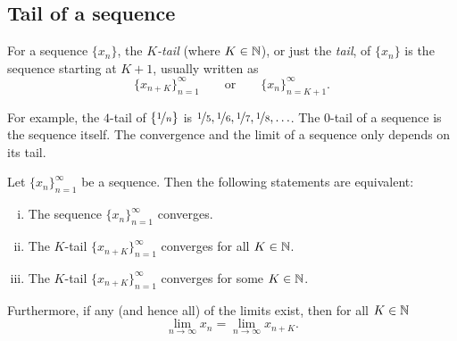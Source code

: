 \subsection{Tail of a sequence}

\begin{defn}
For a sequence $\{ x_n \}$,
the \emph{$K$-tail} (where $K \in {\mathbb{N}}$),
or just the
\emph{tail}, of
$\{ x_n \}$ is the sequence starting at $K+1$, usually written as
\begin{equation*}
\{ x_{n+K} \}_{n=1}^\infty
\qquad \text{or} \qquad \{ x_n \}_{n=K+1}^\infty .
\end{equation*}
\end{defn}

For example, the $4$-tail of $\{ \nicefrac{1}{n} \}$ is
$\nicefrac{1}{5}, \nicefrac{1}{6}, \nicefrac{1}{7}, \nicefrac{1}{8},
\ldots$.  The $0$-tail of a sequence is the sequence itself.
The convergence and the limit of a sequence only depends on its tail.

\begin{prop}
Let $\{ x_n \}_{n=1}^\infty$ be a sequence.  Then the following
statements are equivalent:
\begin{enumerate}[(i)]
\item \label{prop:ktail:i}
The sequence $\{ x_n \}_{n=1}^\infty$ converges.
\item \label{prop:ktail:ii}
The $K$-tail $\{ x_{n+K} \}_{n=1}^\infty$ converges for all $K \in {\mathbb{N}}$.
\item \label{prop:ktail:iii}
The $K$-tail $\{ x_{n+K} \}_{n=1}^\infty$ converges for some $K \in {\mathbb{N}}$.
\end{enumerate}
Furthermore, if any (and hence all) of the limits exist, then for all $K \in {\mathbb{N}}$
\begin{equation*}
\lim_{n\to \infty} x_n = \lim_{n \to \infty} x_{n+K} .
\end{equation*}
\end{prop}

